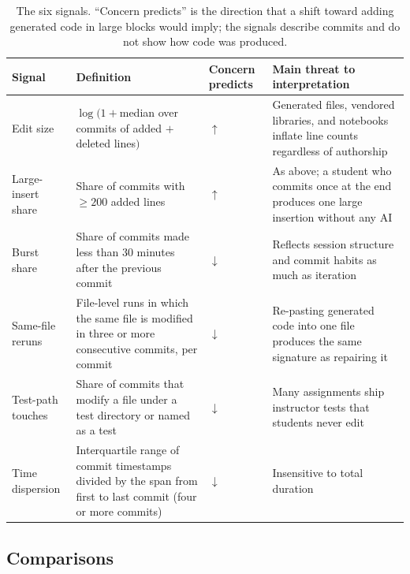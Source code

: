 \documentclass[acmsmall,screen,review,anonymous]{acmart}
\begin{document}
\begin{table}
\caption{The six signals. ``Concern predicts'' is the direction that a shift toward adding generated code in large blocks would imply; the signals describe commits and do not show how code was produced.}
\label{tab:signals}
\footnotesize
\setlength{\tabcolsep}{4pt}
\begin{tabular}{@{}>{\raggedright\arraybackslash}p{1.9cm} >{\raggedright\arraybackslash}p{5.0cm} >{\centering\arraybackslash}p{1.1cm} >{\raggedright\arraybackslash}p{4.9cm}@{}}
\toprule
Signal & Definition & Concern predicts & Main threat to interpretation \\
\midrule
Edit size & $\log(1 + {}$median over commits of added $+$ deleted lines$)$ & $\uparrow$ & Generated files, vendored libraries, and notebooks inflate line counts regardless of authorship \\
Large-insert share & Share of commits with $\geq 200$ added lines & $\uparrow$ & As above; a student who commits once at the end produces one large insertion without any AI \\
Burst share & Share of commits made less than 30 minutes after the previous commit & $\downarrow$ & Reflects session structure and commit habits as much as iteration \\
Same-file reruns & File-level runs in which the same file is modified in three or more consecutive commits, per commit & $\downarrow$ & Re-pasting generated code into one file produces the same signature as repairing it \\
Test-path touches & Share of commits that modify a file under a test directory or named as a test & $\downarrow$ & Many assignments ship instructor tests that students never edit \\
Time dispersion & Interquartile range of commit timestamps divided by the span from first to last commit (four or more commits) & $\downarrow$ & Insensitive to total duration \\
\bottomrule
\end{tabular}
\end{table}

\subsection{Comparisons}
\label{sec:estimands}
\end{document}
